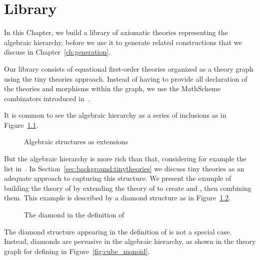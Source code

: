 \chapter{Library}
\label{ch:library}

In this Chapter, we build a library of axiomatic theories representing the algebraic hierarchy, before we use it to generate related constructions that we discuss in Chapter~\ref{ch:generation}. 

Our library consists of equational first-order theories organized as a theory graph using the tiny theories approach. Instead of having to provide all declaration of the theories and morphisms within the graph, we use the MathScheme combinators introduced in~\cite{CaretteOConnorTPC, carette2018building}. 

It is common to see the algebraic hierarchy as a series of inclusions as in Figure~\ref{fig:flatExtensions}. 
\begin{figure}
\caption{Algebraic structures as extensions}
\label{fig:flatExtensions}
\end{figure}  
But the algebraic hierarchy is more rich than that, considering for example the list in~\cite{jipsen}. 
In Section~\ref{sec:background:tinytheories} we discuss tiny theories as an adequate approach to capturing this structure. We present the example of building the theory of  by extending the theory of  to create  and , then combining them. This example is described by a diamond structure as in Figure~\ref{fig:unitalDiamond}. 
\begin{figure}
\caption{The diamond in the definition of }
\label{fig:unitalDiamond}
\end{figure}
The diamond structure appearing in the definition of  is not a special case. Instead, diamonds are pervasive in the algebraic hierarchy, as shown in the theory graph for defining  in Figure~\ref{fig:cube_monoid}. 

